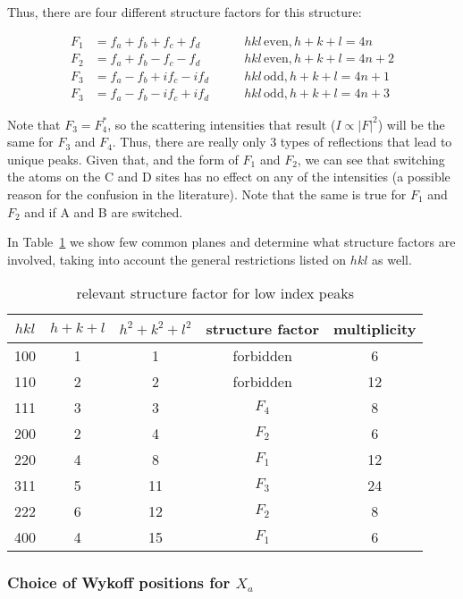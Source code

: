 \documentclass[aps,amsmath,amssymb,prb,superscriptaddress,longtable,preprint,fleqn]{revtex4}
\begin{document}
\noindent Thus, there are four different structure factors for this structure:

\begin{align}
F_1 &= f_a+ f_b + f_c + f_d\qquad &hkl\,\text{even}, h+k+l = 4n\\
F_2 &= f_a+ f_b - f_c - f_d \qquad &hkl\,\text{even}, h+k+l = 4n+2\\
F_3 &= f_a - f_b + if_c - if_d \qquad &hkl\,\text{odd}, h+k+l = 4n+1\\
F_3 &= f_a - f_b - if_c +if_d \qquad &hkl\,\text{odd}, h+k+l = 4n+3
\end{align}

\noindent Note that $F_3=F_4^*$, so the scattering intensities that result ($I\propto|F|^2$) will be the same for $F_3$ and $F_4$. Thus, there are really only 3 types of reflections that lead to unique peaks. Given that, and the form of $F_1$ and $F_2$, we can see that switching the atoms on the C and D sites has no effect on any of the intensities (a possible reason for the confusion in the literature). Note that the same is true for $F_1$ and $F_2$ and if A and B are switched.

In Table~\ref{low-index-xa} we show few common planes and determine what structure factors are involved, taking into account the general restrictions listed on $hkl$ as well.

\begin{table}[h]
\begin{center}
\caption{relevant structure factor for low index peaks}\label{low-index-xa}
\begin{tabular}{ccccc}
$hkl$ & $h+k+l$ & $h^2+k^2+l^2$ & structure factor & multiplicity \\
\hline
100 & 1 & 1 & forbidden  &6\\
110 & 2 & 2 & forbidden &12\\
111 & 3 & 3 & $F_4$ &8\\
200 & 2 & 4 & $F_2$ &6\\
220 & 4 & 8 & $F_1$ &12\\
311 & 5 & 11 & $F_3$ &24\\
222 & 6 & 12 & $F_2$ &8\\
400 & 4 & 15 & $F_1$&6
\end{tabular}
\end{center}
\end{table}%

\subsubsection{Choice of Wykoff positions for $X_a$}
\end{document}
